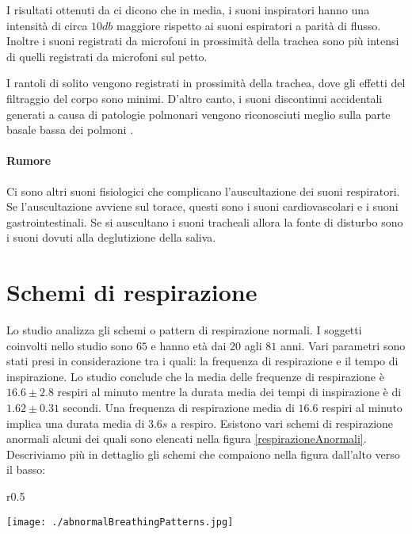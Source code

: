 I risultati ottenuti da \cite{DOIAERSINTSOTHT} ci dicono che in media, i suoni inspiratori hanno una intensit\`a di circa $10db$ maggiore rispetto ai suoni espiratori a parit\`a di flusso. 
Inoltre i suoni registrati da microfoni in prossimit\`a della trachea sono pi\`u intensi di quelli registrati da microfoni sul petto.

I rantoli di solito vengono registrati in prossimit\`a della trachea, dove gli effetti del filtraggio del corpo sono minimi. 
D'altro canto, i suoni discontinui accidentali generati a causa di patologie polmonari vengono riconosciuti meglio sulla parte basale bassa dei polmoni \cite{TLSA}.

\paragraph{Rumore} 
Ci sono altri suoni fisiologici che complicano l'auscultazione dei suoni respiratori. 
Se l'auscultazione avviene sul torace, questi sono i suoni cardiovascolari e i suoni gastrointestinali. 
Se si auscultano i suoni tracheali allora la fonte di disturbo sono i suoni dovuti alla deglutizione della saliva.

\section{Schemi di respirazione}
\label{schemirespiri}

Lo studio \cite{BP} analizza gli schemi o pattern di respirazione normali. I soggetti coinvolti nello studio sono $65$ e hanno et\`a dai $20$ agli $81$ anni. Vari parametri sono stati presi in considerazione tra i quali: la frequenza di respirazione e il tempo di inspirazione. Lo studio conclude che la media delle frequenze di respirazione \`e $16.6\pm 2.8$ respiri al minuto mentre la durata media dei tempi di inspirazione \`e di $1.62\pm 0.31$ secondi.
Una frequenza di respirazione media di $16.6$ respiri al minuto implica una durata media di $3.6s$ a respiro.
Esistono vari schemi di respirazione anormali alcuni dei quali sono elencati nella figura \ref{respirazioneAnormali}. 
Descriviamo pi\`u in dettaglio gli schemi che compaiono nella figura dall'alto verso il basso:
  \begin{wrapfigure}{r}{0.5\textwidth}
     \begin{center}
  \texttt{[image: ./abnormalBreathingPatterns.jpg]}
     \end{center}
    \caption{Elenco di pattern respiratori \cite{ABP}}
    \label{respirazioneAnormali}
\end{wrapfigure}



